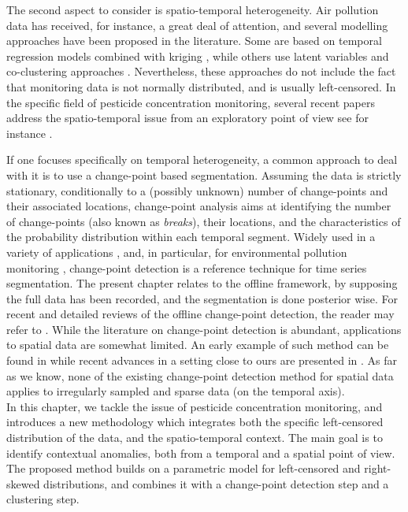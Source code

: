 The second aspect to consider is spatio-temporal heterogeneity. Air pollution data has received, for instance, a great deal of attention, and several modelling approaches have been proposed in the literature. Some are based on temporal regression models combined with kriging \cite{sampson2011,lindstrom2014flexible}, while others use latent variables and co-clustering approaches \cite{bouveyron2021co}. Nevertheless, these approaches do not include the fact that monitoring data is not normally distributed, and is usually left-censored. In the specific field of pesticide concentration monitoring, several recent papers address the spatio-temporal issue from an exploratory point of view see for instance \cite{masia2016,figueiredo2021spatio,aznar2017spatio}. 

If one focuses specifically on temporal heterogeneity, a common approach to deal with it is to use a change-point based segmentation. Assuming the data is strictly stationary, conditionally to a (possibly unknown) number of change-points and their associated locations, change-point analysis aims at identifying the number of change-points (also known as \emph{breaks}), their locations, and the characteristics of the probability distribution within each temporal segment. Widely used in a variety of applications \cite{basseville1993detection, chen2012parametric, liu2017change, reeves2007review, levy2009detection}, and, in particular, for environmental pollution monitoring \cite{costa2016}, change-point detection is a reference technique for time series segmentation. The present chapter relates to the offline framework, by supposing the full data has been recorded, and the segmentation is done posterior wise.  For recent and detailed reviews of the offline change-point detection, the reader may refer to \cite{truong2020,bardet2020}. While the literature on change-point detection is abundant, applications to spatial data are somewhat limited. An early example of such method can be found in \cite{MAJUMDAR2005149} while recent advances in a setting close to ours are presented in \cite{doi:10.1080/07474946.2020.1826796}. As far as we know, none of the existing change-point detection method for spatial data applies to irregularly sampled and sparse data (on the temporal axis). \\
In this chapter, we tackle the issue of pesticide concentration monitoring, and introduces a new methodology which integrates both the specific left-censored distribution of the data, and the spatio-temporal context. The main goal is to identify contextual anomalies, both from a temporal and a spatial point of view. The proposed method builds on a parametric model for left-censored and right-skewed distributions, and combines it with a change-point detection step and a clustering step.\\
